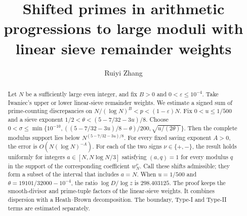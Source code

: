 \documentclass{amsart}
\title[Shifted primes with linear sieve remainder weights]{Shifted primes in arithmetic progressions to large moduli with linear sieve remainder weights}
\author{Ruiyi Zhang}
\numberwithin{equation}{section}
\theoremstyle{definition}
\theoremstyle{plain}
\begin{document}
\begin{abstract}
Let $N$ be a sufficiently large even integer, and fix $B>0$ and
$0<\varepsilon\le10^{-4}$. Take Iwaniec's upper or lower
linear-sieve remainder weights. We estimate a signed sum of
prime-counting discrepancies on $N/(\log N)^B<p<(1-\varepsilon)N$. Fix $0<u\le1/500$ and a sieve exponent
$1/2<\theta<(5-7/32-3u)/8$. Choose
$0<\sigma\le\min\{10^{-10},((5-7/32-3u)/8-\theta)/200,
\sqrt{u/(2\theta)}\}$. Then the complete modulus support lies below
$N^{(5-7/32-3u)/8}$. For every fixed saving exponent $A>0$, the error
is $O(N(\log N)^{-A})$. For each of the two signs $\nu\in\{+,-\}$, the
result holds uniformly for integers $a\in[N,N\log N/3]$ satisfying
$(a,q)=1$ for every modulus
$q$ in the support of the corresponding coefficient $w_N^\nu$. Call these shifts
admissible; they form a subset of the interval that includes $a=N$.
When $u=1/500$ and $\theta=19101/32000-10^{-4}$, the ratio
$\log D/\log z$ is $298.403125$.
The proof keeps the smooth-divisor and prime-tuple factors of the
linear-sieve weights. It combines dispersion with a Heath--Brown
decomposition. The boundary, Type-I and Type-II terms are estimated
separately.
\end{abstract}
\maketitle
\end{document}
